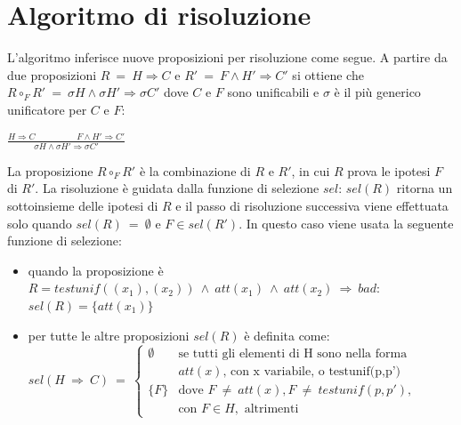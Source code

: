 \documentclass[12pt]{article}
\begin{document}
\section*{Algoritmo di risoluzione}
L'algoritmo inferisce nuove proposizioni per risoluzione come segue. A partire da due proposizioni $R\ =\ H \Rightarrow C$ e $R'\ =\ F \land H' \Rightarrow C'$ si ottiene che $R \circ_F R'\ =\ \sigma H \land \sigma H' \Rightarrow \sigma C'$ dove $C$ e $F$ sono unificabili e $\sigma$ è il più generico unificatore per $C$ e $F$:\\
\begin{center}
    \Large
    $\frac{H\Rightarrow C \hspace{2cm} F \land H' \Rightarrow C'}{\sigma H \land \sigma H' \Rightarrow \sigma C'}$
\end{center}
La proposizione $R \circ_F R'$ è la combinazione di $R$ e $R'$, in cui $R$ prova le ipotesi $F$ di $R'$. La risoluzione è guidata dalla funzione di selezione $sel$: $sel(R)$ ritorna un sottoinsieme delle ipotesi di $R$ e il passo di risoluzione successiva viene effettuata solo quando $sel(R)\ =\ \emptyset$ e $F \in sel(R')$. In questo caso viene usata la seguente funzione di selezione:\\
\begin{itemize}
    \item quando la proposizione è \\$R = testunif((x_1),(x_2))\ \land \ att(x_1)\ \land \ att(x_2)\ \Rightarrow \ bad$:\\
    
    $sel(R) = \{att(x_1)\}$
    \item per tutte le altre proposizioni $sel(R)$ è definita come:\\
    
    $
    sel(H\ \Rightarrow \ C)\ =\  
    \begin{cases} 
    \emptyset & \text{se tutti gli elementi di H sono nella forma } \\
    &  att(x) \text{, con x variabile, o testunif(p,p')} \\
    \{F\} & \text{dove } F\ \neq \ att(x), F\ \neq \ testunif(p,p'),\\
    & \text{con } F \in H, \text{ altrimenti}
    \end{cases}
   $
 \end{itemize}
 
\end{document}
